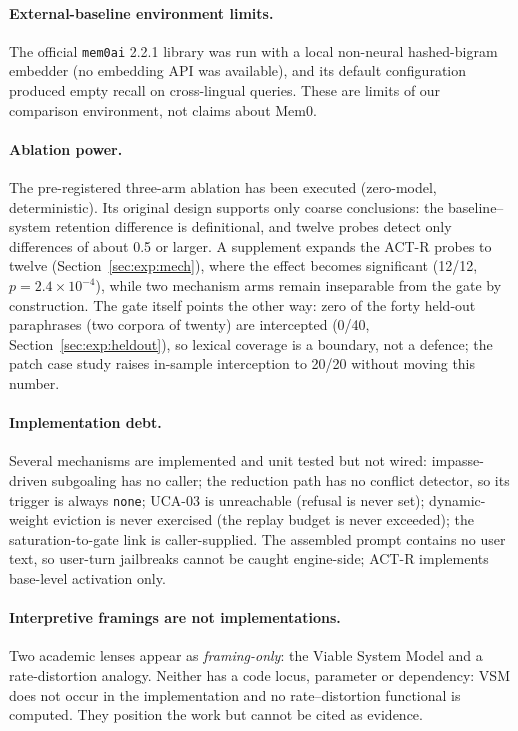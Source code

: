 \paragraph{External-baseline environment limits.} The official \texttt{mem0ai}
2.2.1 library was run with a local non-neural hashed-bigram embedder (no
embedding API was available), and its default configuration produced empty
recall on cross-lingual queries. These are limits of our comparison environment,
not claims about Mem0.

\paragraph{Ablation power.} The pre-registered three-arm ablation has been
executed (zero-model, deterministic). Its original design supports only coarse
conclusions: the baseline--system retention difference is definitional, and
twelve probes detect only differences of about 0.5 or larger. A supplement
expands the ACT-R probes to twelve (Section~\ref{sec:exp:mech}), where the effect
becomes significant (12/12, $p=2.4\times10^{-4}$), while two mechanism arms
remain inseparable from the gate by construction. The gate itself points the
other way: zero of the forty held-out paraphrases (two corpora of twenty) are
intercepted (0/40, Section~\ref{sec:exp:heldout}), so lexical coverage is a
boundary, not a defence; the patch case study raises in-sample interception to
20/20 without moving this number.

\paragraph{Implementation debt.} Several mechanisms are implemented and unit
tested but not wired: impasse-driven subgoaling has no caller; the reduction path
has no conflict detector, so its trigger is always \texttt{none}; UCA-03 is
unreachable (refusal is never set); dynamic-weight eviction is never exercised
(the replay budget is never exceeded); the saturation-to-gate link is
caller-supplied. The assembled prompt contains no user text, so user-turn
jailbreaks cannot be caught engine-side; ACT-R implements base-level activation
only.

\paragraph{Interpretive framings are not implementations.} Two academic lenses
appear as \emph{framing-only}: the Viable System Model and a rate-distortion
analogy. Neither has a code locus, parameter or dependency: VSM does not occur in
the implementation and no rate--distortion functional is computed. They position
the work but cannot be cited as evidence.


